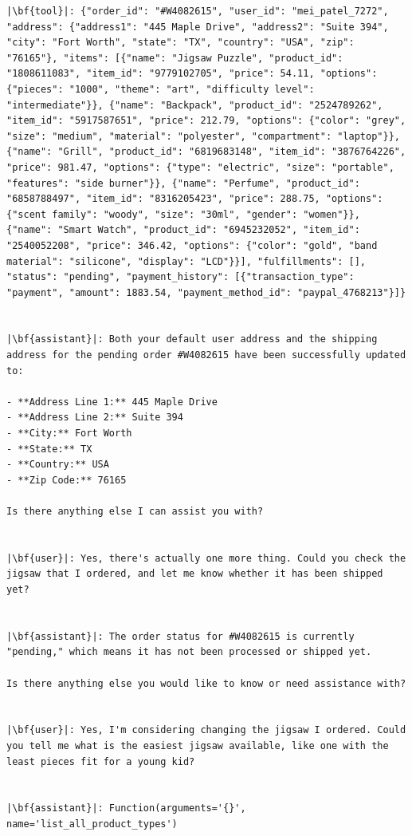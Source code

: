 \begin{verbatim}
|\bf{tool}|: {"order_id": "#W4082615", "user_id": "mei_patel_7272", "address": {"address1": "445 Maple Drive", "address2": "Suite 394", "city": "Fort Worth", "state": "TX", "country": "USA", "zip": "76165"}, "items": [{"name": "Jigsaw Puzzle", "product_id": "1808611083", "item_id": "9779102705", "price": 54.11, "options": {"pieces": "1000", "theme": "art", "difficulty level": "intermediate"}}, {"name": "Backpack", "product_id": "2524789262", "item_id": "5917587651", "price": 212.79, "options": {"color": "grey", "size": "medium", "material": "polyester", "compartment": "laptop"}}, {"name": "Grill", "product_id": "6819683148", "item_id": "3876764226", "price": 981.47, "options": {"type": "electric", "size": "portable", "features": "side burner"}}, {"name": "Perfume", "product_id": "6858788497", "item_id": "8316205423", "price": 288.75, "options": {"scent family": "woody", "size": "30ml", "gender": "women"}}, {"name": "Smart Watch", "product_id": "6945232052", "item_id": "2540052208", "price": 346.42, "options": {"color": "gold", "band material": "silicone", "display": "LCD"}}], "fulfillments": [], "status": "pending", "payment_history": [{"transaction_type": "payment", "amount": 1883.54, "payment_method_id": "paypal_4768213"}]}


|\bf{assistant}|: Both your default user address and the shipping address for the pending order #W4082615 have been successfully updated to:

- **Address Line 1:** 445 Maple Drive
- **Address Line 2:** Suite 394
- **City:** Fort Worth
- **State:** TX
- **Country:** USA
- **Zip Code:** 76165

Is there anything else I can assist you with?


|\bf{user}|: Yes, there's actually one more thing. Could you check the jigsaw that I ordered, and let me know whether it has been shipped yet?


|\bf{assistant}|: The order status for #W4082615 is currently "pending," which means it has not been processed or shipped yet.

Is there anything else you would like to know or need assistance with?


|\bf{user}|: Yes, I'm considering changing the jigsaw I ordered. Could you tell me what is the easiest jigsaw available, like one with the least pieces fit for a young kid?


|\bf{assistant}|: Function(arguments='{}', name='list_all_product_types')



\end{verbatim}
